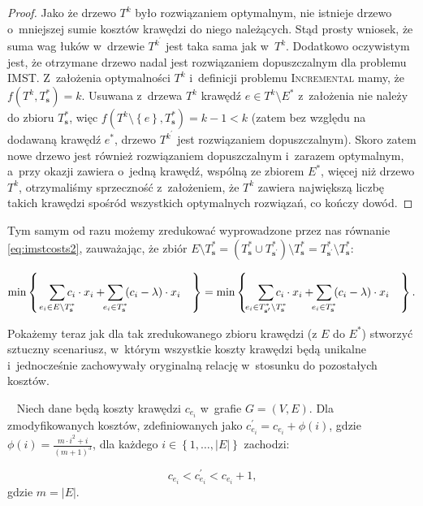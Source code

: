 \begin{proof}
	Jako że drzewo $T^{k}$ było rozwiązaniem optymalnym, nie istnieje drzewo o~mniejszej sumie kosztów krawędzi do niego należących. 
	Stąd prosty wniosek, że suma wag łuków w~drzewie $T^{k^{\prime}}$ jest taka sama jak w~$T^{k}$.
	Dodatkowo oczywistym jest, że otrzymane drzewo nadal jest rozwiązaniem dopuszczalnym dla problemu \textsc{IMST}.
	Z~założenia optymalności $T^{k}$ i~definicji problemu \textsc{Incremental} mamy, że $f \left( T^{k}, T^{\ast}_{\textbf{s}} \right) = k$.
	Usuwana z~drzewa $T^{k}$ krawędź $e \in T^{k} \setminus E^{\ast}$ z~założenia nie należy do zbioru $T^{\ast}_{\textbf{s}}$, więc $f \left( T^{k} \setminus \left\{ e \right\}, T^{\ast}_{\textbf{s}} \right) = k - 1 < k$ (zatem bez względu na dodawaną krawędź $e^{\ast}$, drzewo $T^{k^{\prime}}$ jest rozwiązaniem dopuszczalnym).
	Skoro zatem nowe drzewo jest również rozwiązaniem dopuszczalnym i~zarazem optymalnym, a~przy okazji zawiera o~jedną krawędź, wspólną ze zbiorem $E^{\ast}$, więcej niż drzewo $T^{k}$, otrzymaliśmy sprzeczność z~założeniem, że $T^{k}$ zawiera największą liczbę takich krawędzi spośród wszystkich optymalnych rozwiązań, co kończy dowód.
\end{proof}

Tym samym od razu możemy zredukować wyprowadzone przez nas równanie \ref{eq:imstcosts2}, zauważając, że zbiór $E \setminus T^{\ast}_{\textbf{s}} = \left( T^{\ast}_{\textbf{s}} \cup T^{\ast}_{\textbf{s}^{\prime}} \right) \setminus T^{\ast}_{\textbf{s}} = T^{\ast}_{\textbf{s}^{\prime}} \setminus T^{\ast}_{\textbf{s}}$:

\begin{equation}\label{eq:imstcosts3}
	\min \left\{ \quad \sum_{\mathclap{e_{i} \in E \setminus T^{\ast}_{\textbf{s}}}} c_{i} \cdot x_{i} + \sum_{\mathclap{e_{i} \in T^{\ast}_{\textbf{s}}}} \left( c_{i} - \lambda \right) \cdot x_{i} \quad \right\} = \min \left\{ \quad \sum_{\mathclap{e_{i} \in T^{\ast}_{\textbf{s}^{\prime}} \setminus T^{\ast}_{\textbf{s}}}} c_{i} \cdot x_{i} + \sum_{\mathclap{e_{i} \in T^{\ast}_{\textbf{s}}}} \left( c_{i} - \lambda \right) \cdot x_{i} \quad \right\}\text{.}
\end{equation}
	
Pokażemy teraz jak dla tak zredukowanego zbioru krawędzi (z $E$ do $E^{\ast}$) stworzyć sztuczny scenariusz, w~którym wszystkie koszty krawędzi będą unikalne i~jednocześnie zachowywały oryginalną relację w~stosunku do pozostałych kosztów.

\begin{lemma}~\cite{Dimitromanolakis02analysisof}\label{lm:Dimitromanolakis02analysisof}
	Niech dane będą koszty krawędzi $c_{e_{i}}$ w~grafie $G = \left( V, E \right)$.
	Dla zmodyfikowanych kosztów, zdefiniowanych jako $c^{\prime}_{e_{i}} = c_{e_{i}} + \phi \left( i \right)$, gdzie $\phi \left( i \right) = \frac{m \cdot i^{2} + i}{\left( m + 1 \right)^{3}}$, dla każdego $i \in \left\{ 1, \dots, \left| E \right| \right\}$ zachodzi:
	
	\begin{equation}\label{eq:Dimitromanolakis1}
		c_{e_{i}} < c^{\prime}_{e_{i}} < c_{e_{i}} + 1\text{,}
	\end{equation}
	gdzie $m = \left| E \right|$.
\end{lemma}

